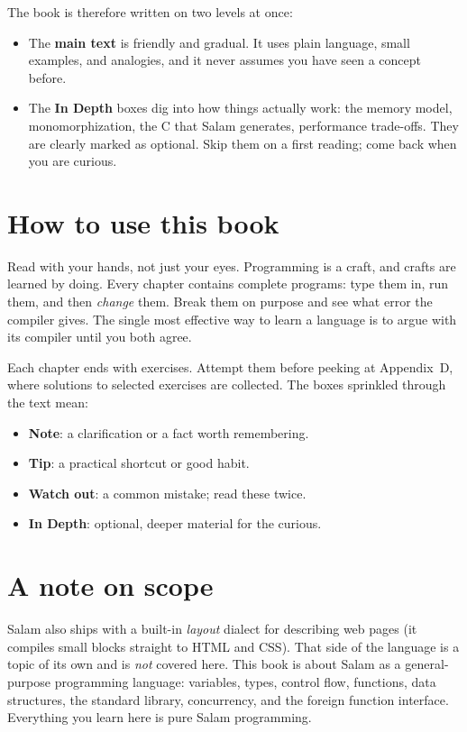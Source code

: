 The book is therefore written on two levels at once:

\begin{itemize}[leftmargin=1.4em]
  \item The \textbf{main text} is friendly and gradual. It uses plain language,
        small examples, and analogies, and it never assumes you have seen a
        concept before.
  \item The \textbf{In Depth} boxes dig into how things actually work: the
        memory model, monomorphization, the C that Salam generates,
        performance trade-offs. They are clearly marked as optional. Skip them
        on a first reading; come back when you are curious.
\end{itemize}

\section*{How to use this book}

Read with your hands, not just your eyes. Programming is a craft, and crafts are
learned by doing. Every chapter contains complete programs: type them in, run
them, and then \emph{change} them. Break them on purpose and see what error the
compiler gives. The single most effective way to learn a language is to argue
with its compiler until you both agree.

Each chapter ends with exercises. Attempt them before peeking at
Appendix~D, where solutions to selected exercises are collected. The boxes
sprinkled through the text mean:

\begin{itemize}[leftmargin=1.4em]
  \item \textbf{Note}: a clarification or a fact worth remembering.
  \item \textbf{Tip}: a practical shortcut or good habit.
  \item \textbf{Watch out}: a common mistake; read these twice.
  \item \textbf{In Depth}: optional, deeper material for the curious.
\end{itemize}

\section*{A note on scope}

Salam also ships with a built-in \emph{layout} dialect for describing web pages
(it compiles small  blocks straight to HTML and CSS). That side of
the language is a topic of its own and is \emph{not} covered here. This book is
about Salam as a general-purpose programming language: variables, types, control
flow, functions, data structures, the standard library, concurrency, and the
foreign function interface. Everything you learn here is pure Salam
programming.

